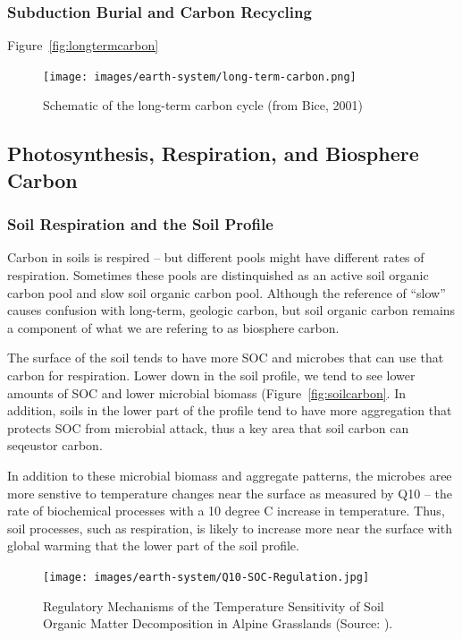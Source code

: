 \documentclass{book}\usepackage{knitr}
\begin{document}
\subsubsection{Subduction Burial and Carbon Recycling}

Figure~\ref{fig:longtermcarbon}

\begin{figure}
\texttt{[image: images/earth-system/long-term-carbon.png]}
\caption{Schematic of the long-term carbon cycle (from Bice, 2001)}
\label{longtermcarbon}
\end{figure}

\subsection{Photosynthesis, Respiration, and Biosphere Carbon}

\subsubsection{Soil Respiration and the Soil Profile}

Carbon in soils is respired -- but different pools might have different rates of respiration. Sometimes these pools are distinquished as an active soil organic carbon pool and slow soil organic carbon pool. Although the reference of ``slow'' causes confusion with long-term, geologic carbon, but soil organic carbon remains a component of what we are refering to as biosphere carbon. 

The surface of the soil tends to have more SOC and microbes that can use that carbon for respiration. Lower down in the soil profile, we tend to see lower amounts of SOC and lower microbial biomass (Figure~\ref{fig:soilcarbon}. In addition, soils in the lower part of the profile tend to have more aggregation that protects SOC from microbial attack, thus a key area that soil carbon can seqeustor carbon. 

In addition to these microbial biomass and aggregate patterns, the microbes aree more senstive to temperature changes near the surface as measured by Q10 -- the rate of biochemical processes with a 10 degree C increase in temperature. Thus, soil processes, such as respiration, is likely to increase more near the surface with global warming that the lower part of the soil profile.  

\begin{figure}
\texttt{[image: images/earth-system/Q10-SOC-Regulation.jpg]}
\caption{Regulatory Mechanisms of the Temperature Sensitivity of Soil Organic Matter Decomposition in Alpine Grasslands (Source: \citet{Qineaau1218, CAS2021researchers}).}
\label{fig:Q10-SOC}
\end{figure}
\end{document}
